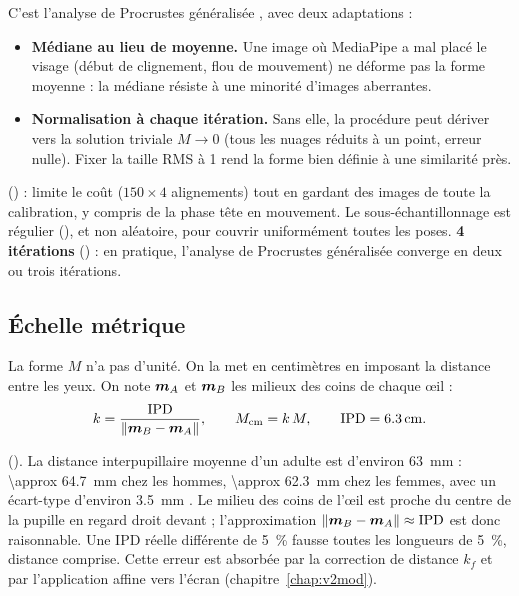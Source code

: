C'est l'analyse de Procrustes généralisée \cite{gower1975}, avec deux adaptations :
\begin{itemize}
  \item \textbf{Médiane au lieu de moyenne.} Une image où MediaPipe a mal placé le visage (début de clignement, flou de mouvement) ne déforme pas la forme moyenne : la médiane résiste à une minorité d'images aberrantes.
  \item \textbf{Normalisation à chaque itération.} Sans elle, la procédure peut dériver vers la solution triviale $M \to 0$ (tous les nuages réduits à un point, erreur nulle). Fixer la taille RMS à 1 rend la forme bien définie à une similarité près.
\end{itemize}

\begin{origine}
 (\empi) : limite le coût ($150 \times 4$ alignements) tout en gardant des images de toute la calibration, y compris de la phase tête en mouvement. Le sous-échantillonnage est régulier (), et non aléatoire, pour couvrir uniformément toutes les poses. \textbf{4 itérations} (\empi) : en pratique, l'analyse de Procrustes généralisée converge en deux ou trois itérations.
\end{origine}

\subsection{Échelle métrique}

La forme $M$ n'a pas d'unité. On la met en centimètres en imposant la distance entre les yeux. On note $\bm{m}_A$ et $\bm{m}_B$ les milieux des coins de chaque œil :
\begin{equation}
  k = \frac{\text{IPD}}{\|\bm{m}_B - \bm{m}_A\|}, \qquad M_\text{cm} = k\,M, \qquad \text{IPD} = \qty{6.3}{\centi\metre}.
\end{equation}

\begin{origine}
 (\litt). La distance interpupillaire moyenne d'un adulte est d'environ \qty{63}{\milli\metre} : \qty{\approx 64.7}{\milli\metre} chez les hommes, \qty{\approx 62.3}{\milli\metre} chez les femmes, avec un écart-type d'environ \qty{3.5}{\milli\metre} \cite{dodgson2004}. Le milieu des coins de l'œil est proche du centre de la pupille en regard droit devant ; l'approximation $\|\bm{m}_B - \bm{m}_A\| \approx \text{IPD}$ est donc raisonnable. Une IPD réelle différente de \qty{5}{\percent} fausse toutes les longueurs de \qty{5}{\percent}, distance comprise. Cette erreur est absorbée par la correction de distance $k_f$ et par l'application affine vers l'écran (chapitre~\ref{chap:v2mod}).
\end{origine}

